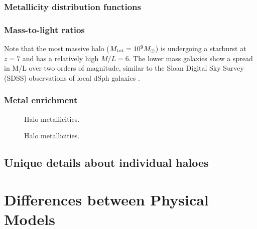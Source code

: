 \documentclass[useAMS,usenatbib]{mn2e}
\begin{document}
\subsubsection{Metallicity distribution functions}

\subsubsection{Mass-to-light ratios}
\label{sec:mlratios}

Note that the most massive halo ($M_{\rm tot} = 10^9 \Ms$) is
undergoing a starburst at $z=7$ and has a relatively high $M/L = 6$.
The lower mass galaxies show a spread in M/L over two orders of
magnitude, similar to the Sloan Digital Sky Survey (SDSS) observations
of local dSph galaxies \citep[e.g.][]{Strigari08}.

\subsubsection{Metal enrichment}

\begin{figure}
  \caption{\label{fig:zhalo2} Halo metallicities.}
\end{figure}

\begin{figure}
  \caption{\label{fig:ztot} Halo metallicities.}
\end{figure}


\subsection{Unique details about individual haloes}

\section{Differences between Physical Models}
\label{sec:models}
\end{document}
